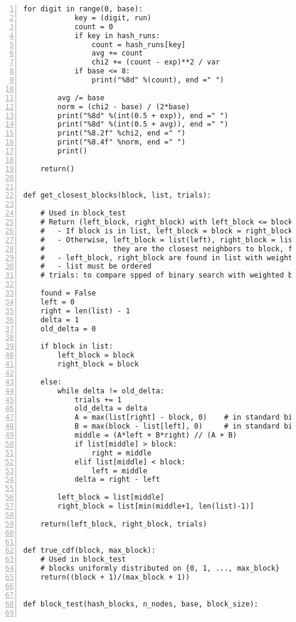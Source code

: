 \documentclass[oneside,10pt]{book}
\begin{document}
\begin{lstlisting}[numbers=left]
        for digit in range(0, base):
            key = (digit, run)
            count = 0
            if key in hash_runs:
                count = hash_runs[key]
                avg += count
                chi2 += (count - exp)**2 / var 
            if base <= 8: 
                print("%8d" %(count), end =" ")

        avg /= base
        norm = (chi2 - base) / (2*base)
        print("%8d" %(int(0.5 + exp)), end =" ")
        print("%8d" %(int(0.5 + avg)), end =" ")
        print("%8.2f" %chi2, end =" ")
        print("%8.4f" %norm, end =" ")
        print()

    return()


def get_closest_blocks(block, list, trials):

    # Used in block_test
    # Return (left_block, right_block) with left_block <= block <= right_block, 
    #   - If block is in list, left_block = block = right_block
    #   - Otherwise, left_block = list(left), right_block = list(right); 
    #                they are the closest neighbors to block, found in list
    #   - left_block, right_block are found in list with weighted binary search
    #   - list must be ordered
    # trials: to compare spped of binary search with weighted binary search

    found = False
    left = 0
    right = len(list) - 1
    delta = 1
    old_delta = 0 
    
    if block in list:
        left_block = block
        right_block = block

    else:
        while delta != old_delta:
            trials += 1
            old_delta = delta   
            A = max(list[right] - block, 0)    # in standard binary search: A = 1
            B = max(block - list[left], 0)     # in standard binary search: B = 1
            middle = (A*left + B*right) // (A + B) 
            if list[middle] > block:
                right = middle
            elif list[middle] < block: 
                left = middle
            delta = right - left

        left_block = list[middle]
        right_block = list[min(middle+1, len(list)-1)]

    return(left_block, right_block, trials)


def true_cdf(block, max_block): 
    # Used in block_test
    # blocks uniformly distributed on {0, 1, ..., max_block}
    return((block + 1)/(max_block + 1))


def block_test(hash_blocks, n_nodes, base, block_size):


\end{lstlisting}
\end{document}

